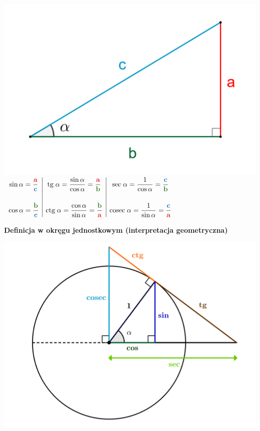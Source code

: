 \documentclass[14pt,a4paper]{extarticle}
\newcommand{\textbfcolor}[2]{\textcolor{#1}{\textbf{#2}}}
\begin{document}
{%

\renewcommand{\arraystretch}{1.4}

\begin{center}

\includegraphics[scale=0.4]{trygonometria definicja w trójkącie.png}
\(\begin{array}{c|c|c}
   \sin \alpha = \dfrac{\textbfcolor{Red}{a}}{\textbfcolor{NavyBlue}{c}} & \text{tg}\; \alpha = \dfrac{\sin \alpha}{\cos \alpha} = \dfrac{\textbfcolor{Red}{a}}{\textbfcolor{OliveGreen}{b}} & \text{sec}\; \alpha = \dfrac{1}{\cos \alpha} = \dfrac{\textbfcolor{NavyBlue}{c}}{\textbfcolor{OliveGreen}{b}}\\[0.7cm]
   \cos \alpha = \dfrac{\textbfcolor{OliveGreen}{b}}{\textbfcolor{NavyBlue}{c}} & \text{ctg} \; \alpha = \dfrac{\cos \alpha}{\sin \alpha} = \dfrac{\textbfcolor{OliveGreen}{b}}{\textbfcolor{Red}{a}} & \text{cosec}\; \alpha = \dfrac{1}{\sin \alpha} = \dfrac{\textbfcolor{NavyBlue}{c}}{\textbfcolor{Red}{a}}
\end{array}\)  

\end{center}
\noindent\textbf{Definicja w okręgu jednostkowym (interpretacja geometryczna)}
\begin{center}

\includegraphics[scale=0.55]{trygonometria definicja w okręgu.png}

\end{center}
}%
\end{document}
